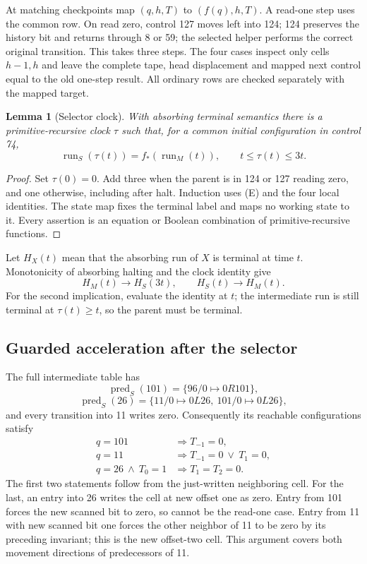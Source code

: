 \documentclass[11pt,letterpaper]{article}
\newtheorem{lemma}[theorem]{Lemma}
\begin{document}
At matching checkpoints map $(q,h,T)$ to $(f(q),h,T)$. A read-one step
uses the common row. On read zero, control 127 moves left into 124;
124 preserves the history bit and returns through 8 or 59; the selected
helper performs the correct original transition. This takes three steps.
The four cases inspect only cells $h-1,h$ and leave the complete tape,
head displacement and mapped next control equal to the old one-step
result. All ordinary rows are checked separately with the mapped target.

\begin{lemma}[Selector clock]
With absorbing terminal semantics there is a primitive-recursive clock
$\tau$ such that, for a common initial configuration in control 74,
\[
 \operatorname{run}_S(\tau(t))=f_*(\operatorname{run}_M(t)),\qquad
 t\le\tau(t)\le3t.
\]
\end{lemma}
\begin{proof}
Set $\tau(0)=0$. Add three when the parent is in 124 or 127 reading zero,
and one otherwise, including after halt. Induction uses (E) and the
four local identities. The state map fixes the terminal label and maps
no working state to it. Every assertion is an equation or Boolean
combination of primitive-recursive functions.
\end{proof}

Let $H_X(t)$ mean that the absorbing run of $X$ is terminal at time $t$.
Monotonicity of absorbing halting and the clock identity give
\[
 H_M(t)\to H_S(3t),\qquad H_S(t)\to H_M(t).       \tag{S}
\]
For the second implication, evaluate the identity at $t$; the intermediate
run is still terminal at $\tau(t)\ge t$, so the parent must be terminal.

\subsection{Guarded acceleration after the selector}

The full intermediate table has
\[
 \operatorname{pred}_S(101)=\{96/0\mapsto0R101\},
\]
\[
 \operatorname{pred}_S(26)=\{11/0\mapsto0L26,\ 101/0\mapsto0L26\},
\]
and every transition into 11 writes zero. Consequently its reachable
configurations satisfy
\begin{align*}
 q=101&\Rightarrow T_{-1}=0,\\
 q=11&\Rightarrow T_{-1}=0\ \lor\ T_1=0,\\
 q=26\ \land\ T_0=1&\Rightarrow T_1=T_2=0.       \tag{G}
\end{align*}
The first two statements follow from the just-written neighboring cell.
For the last, an entry into 26 writes the cell at new offset one as zero.
Entry from 101 forces the new scanned bit to zero, so cannot be the
read-one case. Entry from 11 with new scanned bit one forces the other
neighbor of 11 to be zero by its preceding invariant; this is the new
offset-two cell. This argument covers both movement directions of
predecessors of 11.
\end{document}
